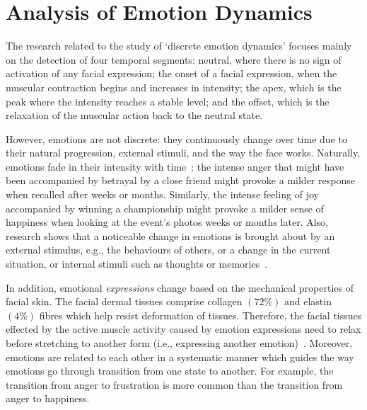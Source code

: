 \documentclass[10pt,journal,cspaper,compsoc]{IEEEtran}
\begin{document}

\section{Analysis of Emotion Dynamics}
\label{sec_analysis}
The research related to the study of `discrete emotion dynamics' focuses mainly on the detection of four temporal segments: neutral, where there is no sign of activation of any facial expression; the onset of a facial expression, when the muscular contraction begins and increases in intensity; the apex, which is the peak where the intensity reaches a stable level; and the offset, which is the relaxation of the muscular action back to the neutral state.

However, emotions are not discrete: they continuously change over time due to their natural progression, external stimuli, and the way the face works. Naturally, emotions fade in their intensity with time~\cite{ritchie2009fading}: the intense anger that might have been accompanied by betrayal by a close friend might provoke a milder response when recalled after weeks or months. Similarly, the intense feeling of joy accompanied by winning a championship might provoke a milder sense of happiness when looking at the event's photos weeks or months later. Also, research shows that a noticeable change in emotions is brought about by an external stimulus, e.g., the behaviours of others, or a change in the current situation, or internal stimuli such as thoughts or memories~\cite{scherer2000psychological}. 

In addition, emotional \emph{expressions} change based on the mechanical properties of facial skin. The facial dermal tissues comprise collagen $(72\%)$ and elastin $(4\%)$ fibres which help resist deformation of tissues. Therefore, the facial tissues effected by the active muscle activity caused by emotion expressions need to relax before stretching to another form (i.e., expressing another emotion)~\cite{terzopoulos1990physically}. Moreover, emotions are related to each other in a systematic manner which guides the way emotions go through transition from one state to another. For example, the transition from anger to frustration is more common than the transition from anger to happiness.
\end{document}
